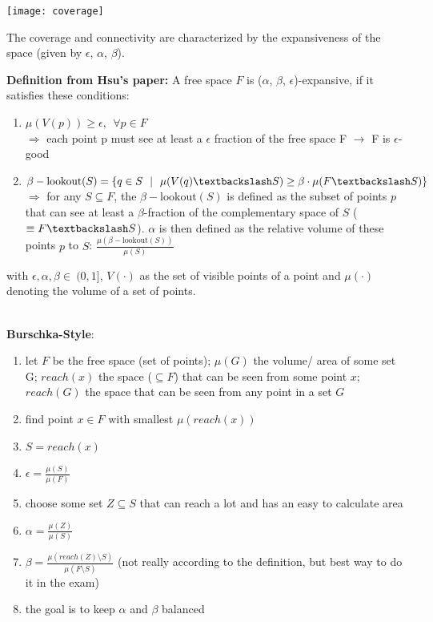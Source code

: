 \begin{multicols*}{2}
\texttt{[image: coverage]}

The coverage and connectivity are characterized by the expansiveness of the space (given by $\epsilon$, $\alpha$, $\beta$).

\textbf{Definition from Hsu's paper:} A free space $F$ is ($\alpha$, $\beta$, $\epsilon$)-expansive, if it satisfies these conditions: 
\begin{enumerate}
	\item $\mu (V(p))  \geq \epsilon , ~~ \forall p \in F$ \\
	$\Rightarrow$ each point p must see at least a $\epsilon$ fraction of the free space F $\rightarrow$ F is $\epsilon$-good
	\item $\beta-\mathrm{lookout}(S) = \{q\in S ~~|~~ \mu(V(q)\textbackslash S) \geq \beta \cdot \mu(F\textbackslash S)\} $ \\
	$\Rightarrow$ for any $S \subseteq F$, the $\beta-\mathrm{lookout}(S)$ is defined as the subset of points $p$ that can see at least a $\beta$-fraction of the complementary space of $S$ ($\equiv F\textbackslash S$). $\alpha$ is then defined as the relative volume of these points $p$ to $S$: $\frac{\mu(\beta-\mathrm{lookout}(S))}{\mu(S)}$
\end{enumerate}

with $\epsilon, \alpha, \beta \in \ (0,1]$, $V(\cdot)$ as the set of visible points of a point and $\mu(\cdot)$ denoting the volume of a set of points.

~\\
\textbf{Burschka-Style}:
\begin{enumerate}
	\item let $F$ be the free space (set of points); $\mu(G)$ the volume/ area of some set G; $reach(x)$ the space ($\subseteq F$) that can be seen from some point $x$; $reach(G)$ the space that can be seen from any point in a set $G$
	\item find point $x \in F$ with smallest $\mu(reach(x))$
	\item $S = reach(x)$
	\item $\epsilon = \frac{\mu(S)}{\mu(F)}$
	\item choose some set $Z \subseteq S$ that can reach a lot and has an easy to calculate area
	\item $\alpha = \frac{\mu(Z)}{\mu(S)}$
	\item $\beta = \frac{\mu(reach(Z) \setminus S)}{\mu(F \setminus S)}$ (not really according to the definition, but best way to do it in the exam)
	\item the goal is to keep $\alpha$ and $\beta$ balanced
\end{enumerate}


\end{multicols*}
